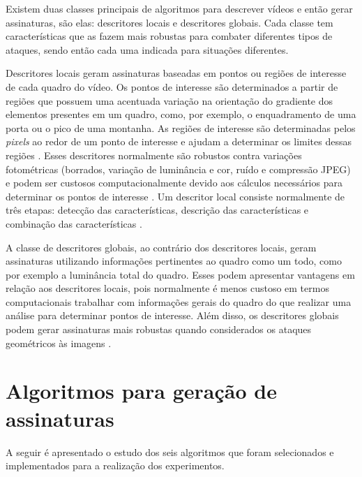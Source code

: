 


    Existem duas classes principais de algoritmos para descrever vídeos e então gerar assinaturas, são elas: descritores locais e descritores globais. Cada classe tem características que as fazem mais robustas para combater diferentes tipos de ataques, sendo então cada uma indicada para situações diferentes.
    
    Descritores locais geram assinaturas baseadas em pontos ou regiões de interesse de cada quadro do vídeo. Os pontos de interesse são determinados a partir de regiões que possuem uma acentuada variação na orientação do gradiente dos elementos presentes em um quadro, como, por exemplo, o enquadramento de uma porta ou o pico de uma montanha. As regiões de interesse são determinadas pelos \textit{pixels} ao redor de um ponto de interesse e ajudam a determinar os limites dessas regiões \cite{radhakrishnan2007content}. Esses descritores normalmente são robustos contra variações fotométricas (borrados, variação de luminância e cor, ruído e compressão JPEG) e podem ser custosos computacionalmente devido aos cálculos necessários para determinar os pontos de interesse \cite{naini2014vanishing}. Um descritor local consiste normalmente de três etapas: detecção das características, descrição das características e combinação das características \cite{chen2010zernike}.

    A classe de descritores globais, ao contrário dos descritores locais, geram assinaturas utilizando informações pertinentes ao quadro como um todo, como por exemplo a luminância total do quadro. Esses podem apresentar vantagens em relação aos descritores locais, pois normalmente é menos custoso em termos computacionais trabalhar com informações gerais do quadro do que realizar uma análise para determinar pontos de interesse. Além disso, os descritores globais podem gerar assinaturas mais robustas quando considerados os ataques geométricos às imagens \cite{law2007video}. 
    
\section{Algoritmos para geração de assinaturas}
	A seguir é apresentado o estudo dos seis algoritmos que foram selecionados e implementados para a realização dos experimentos.


